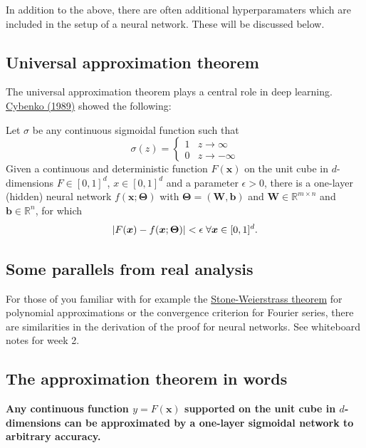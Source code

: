 \documentclass[%
oneside,                 %
final,                   %
10pt]{article}
\begin{document}
In addition to the above, there are often additional hyperparamaters
which are included in the setup of a neural network. These will be
discussed below.

\subsection{Universal approximation theorem}

The universal approximation theorem plays a central role in deep
learning.  \href{{https://link.springer.com/article/10.1007/BF02551274}}{Cybenko (1989)} showed
the following:

\begin{block}{}
Let $\sigma$ be any continuous sigmoidal function such that
\[
\sigma(z) = \left\{\begin{array}{cc} 1 & z\rightarrow \infty\\ 0 & z \rightarrow -\infty \end{array}\right.
\]
Given a continuous and deterministic function $F(\bm{x})$ on the unit
cube in $d$-dimensions $F\in [0,1]^d$, $x\in [0,1]^d$ and a parameter
$\epsilon >0$, there is a one-layer (hidden) neural network
$f(\bm{x};\bm{\Theta})$ with $\bm{\Theta}=(\bm{W},\bm{b})$ and $\bm{W}\in
\mathbb{R}^{m\times n}$ and $\bm{b}\in \mathbb{R}^{n}$, for which
\[
\vert F(\bm{x})-f(\bm{x};\bm{\Theta})\vert < \epsilon \hspace{0.1cm} \forall \bm{x}\in[0,1]^d.
\]

\end{block}

\subsection{Some parallels from real analysis}

For those of you familiar with for example the \href{{https://en.wikipedia.org/wiki/Stone%E2%80%93Weierstrass_theorem}}{Stone-Weierstrass
theorem}
for polynomial approximations or the convergence criterion for Fourier
series, there are similarities in the derivation of the proof for
neural networks. See whiteboard notes for week 2.

\subsection{The approximation theorem in words}

\textbf{Any continuous function $y=F(\bm{x})$ supported on the unit cube in
$d$-dimensions can be approximated by a one-layer sigmoidal network to
arbitrary accuracy.}
\end{document}
